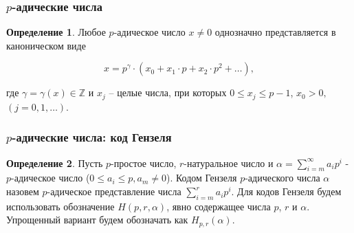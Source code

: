 \documentclass[10pt,professionalfont,utf8,presentation,compress]{beamer}
\theoremstyle{definition}
\newtheorem{defn}{Определение}
\theoremstyle{plain}
\newtheorem{exmp}{Пример}
\begin{document}
\begin{frame}
\frametitle{$p$-адические числа}
\begin{defn}
Любое $p$-адическое число $x \ne 0$ однозначно представляется в каноническом виде

\begin{equation} \label{numbers:decomposition}
	x = p^{\gamma} \cdot (x_0 + x_1\cdot p + x_2 \cdot p^2 + \dots),
\end{equation}

\noindent где $\gamma = \gamma(x) \in \mathbb {Z}$ и $x_j$ -- целые числа, при которых $0 \le x_j \le p-1$, $x_0 > 0,$ $(j=0,1,\dots)$.
\end{defn}
\end{frame}









\begin{frame}
\frametitle{$p$-адические числа: код Гензеля}
\begin{defn}
Пусть $p$-простое число, $r$-натуральное число и $\alpha=\sum\limits^{\infty}_{i=m} a_ip^i$ - $p$-адическое число ($0 \le a_i \le p, a_m \neq 0$). Кодом Гензеля $p$-адического числа $\alpha$ назовем $p$-адическое представление числа $\sum\limits_{i=m}^{r}a_ip^i$. Для кодов Гензеля будем использовать обозначение $H(p,r,\alpha)$, явно содержащее числа $p$, $r$ и $\alpha$. Упрощенный вариант будем обозначать как $H_{p,r}(\alpha)$.
\end{defn}
\end{frame}
\end{document}
